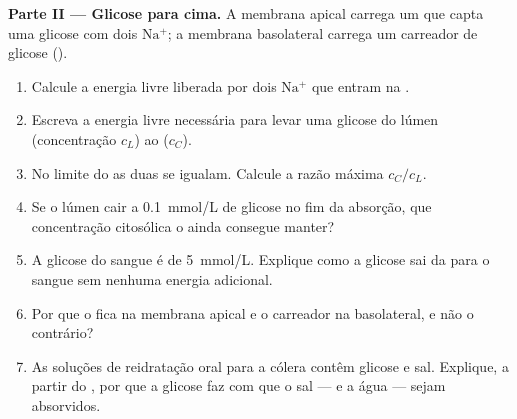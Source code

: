 \begin{problem}
\medskip
\noindent\textbf{Parte II --- Glicose para cima.}
A membrana apical carrega um  que capta uma glicose com dois
$\mathrm{Na^+}$; a membrana basolateral carrega um carreador de glicose
().
\begin{enumerate}[resume]
  \item Calcule a energia livre liberada por dois $\mathrm{Na^+}$ que
        entram na .
  \item Escreva a energia livre necessária para levar uma glicose do
        lúmen (concentração $c_L$) ao  ($c_C$).
  \item No limite do  as duas se igualam. Calcule a razão
        máxima $c_C/c_L$.
  \item Se o lúmen cair a \qty{0.1}{mmol/L} de glicose no fim da
        absorção, que concentração citosólica o  ainda
        consegue manter?
  \item A glicose do sangue é de \qty{5}{mmol/L}. Explique como a
        glicose sai da  para o sangue sem nenhuma energia
        adicional.
  \item Por que o  fica na membrana apical e o carreador na
        basolateral, e não o contrário?
  \item As soluções de reidratação oral para a cólera contêm glicose e
        sal. Explique, a partir do , por que a glicose faz
        com que o sal --- e a água --- sejam absorvidos.
\end{enumerate}


\end{problem}
